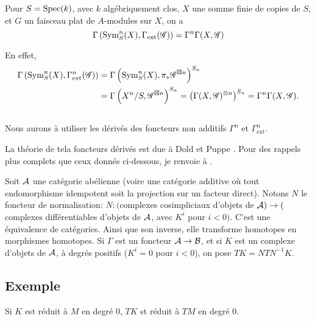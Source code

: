 \begin{lemma_}\label{III:1-3}
Pour $S=\operatorname{Spec}(k)$, avec $k$ alg\'ebriquement clos, $X$ une somme finie de 
copies de $S$, et $G$ un faisceau plat de $A$-modules sur $X$, on a 
\[
  \Gamma\left(\operatorname{Sym}_S^n(X),\Gamma_\text{ext}(\mathscr{G})\right) = \Gamma^n \Gamma(X,\mathscr{G})
\]
\end{lemma_}

En effet, 
\begin{align*}
  \Gamma\left(\operatorname{Sym}_S^n(X),\Gamma_\text{ext}^n(\mathscr{G})\right) 
    &= \Gamma\left(\operatorname{Sym}_S^n(X),\pi_*\mathscr{G}^{\boxtimes n}\right)^{S_n} \\
    &= \Gamma\left(X^n/S,\mathscr{G}^{\boxtimes n}\right)^{S_n} 
    = \left(\Gamma(X,\mathscr{G})^{\otimes n}\right)^{S_n} 
    = \Gamma^n \Gamma(X,\mathscr{G}) \text{.}
\end{align*}





\subsection{}\label{III:1-4}

Nous aurons \`a utiliser les d\'eriv\'es des foncteurs non additifs $\Gamma^n$ 
et $\Gamma_\text{ext}^n$. 

La th\'eorie de tela foncteurs d\'eriv\'es est due \`a Dold et Puppe 
\cite{do61}. Pour des rappels plus complets que ceux donn\'es ci-dessous, je 
renvoie \`a \cite[XVII 5.5.3]{sga4}. 

Soit $\mathcal{A}$ une cat\'egorie ab\'elienne (voire une cat\'egorie additive o\`u 
tout endomorphisme idempotent soit la projection sur un facteur direct). Notons 
$N$ le foncteur de normalisation: $N:($complexes cosimpliciaux d'objets de 
$\mathcal{A})\to($complexes différentiables d'objets de $\mathcal{A}$, avec $K^i$ pour 
$i<0)$. C'est une \'equivalence de cat\'egories. Ainsi que son inverse, elle 
transforme homotopes en morphismes homotopes. Si $\Gamma$ est un foncteur 
$\mathcal{A}\to\mathcal{B}$, et si $K$ est un complexe d'objets de $\mathcal{A}$, \`a degr\'es 
positifs ($K^i=0$ pour $i<0$), on pose $T K=N T N^{-1} K$. 





\subsection{Exemple}\label{III:1-5}

Si $K$ est r\'eduit \`a $M$ en degr\'e $0$, $T K$ st r\'eduit \`a $T M$ en 
degr\'e $0$. 






